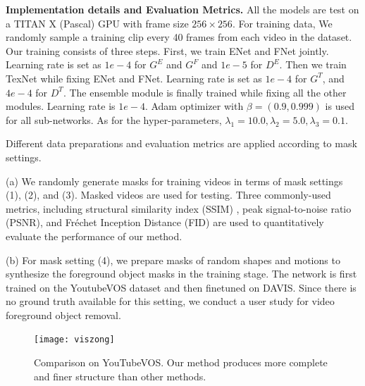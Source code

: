 \noindent \textbf{Implementation details and Evaluation Metrics.} 
All the models are test on a TITAN X (Pascal) GPU with frame size $256 \times 256$.
For training data, We randomly sample a training clip every 40 frames from each video in the dataset. Our training consists of three steps. First, we train ENet and FNet jointly. Learning rate is set as $1e-4$ for $G^E$ and $G^F$ and $1e-5$ for $D^E$. 
Then we train TexNet while fixing ENet and FNet. Learning rate is set as $1e-4$ for $G^T$, and $4e-4$ for $D^T$.
The ensemble module is finally trained while fixing all the other modules. Learning rate is $1e-4$.
Adam optimizer with $\beta=(0.9, 0.999)$ is used for all sub-networks.
As for the hyper-parameters, $\lambda_1=10.0,\lambda_2=5.0, \lambda_3=0.1$.

Different data preparations and evaluation metrics are applied according to mask settings.

\noindent (a) We randomly generate masks for training videos in terms of mask settings (1), (2), and (3). Masked videos are used for testing.
Three commonly-used metrics, including structural similarity index (SSIM) \cite{wang2004image}, peak signal-to-noise ratio (PSNR), and Fr{\'e}chet Inception Distance (FID) \cite{heusel2017gans} are used to quantitatively evaluate the performance of our method. 

\noindent (b) For mask setting (4), we prepare masks of random shapes and motions to synthesize the foreground object masks in the training stage. The network is first trained on the YoutubeVOS dataset and then finetuned on DAVIS. Since there is no ground truth available for this setting, we conduct a user study for video foreground object removal.  






\begin{figure}[t]
	\centering
	\texttt{[image: viszong]} %
	\caption{Comparison on YouTubeVOS.  Our method produces more complete and finer structure than other methods.  }
	\label{viszong}
\end{figure}


